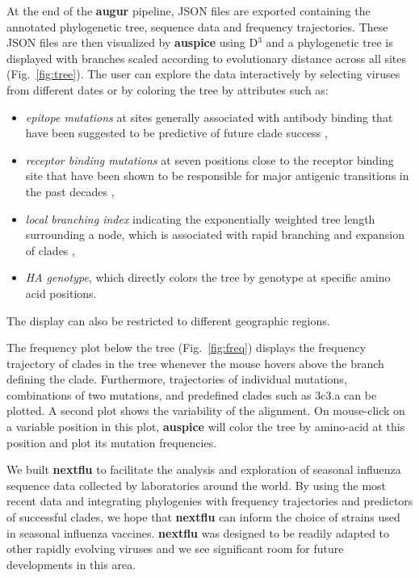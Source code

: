 \documentclass{bioinfo}
\newcommand{\FIG}[1]{Fig.~\ref{fig:#1}}
\newcommand{\augur}{\textbf{augur}}
\newcommand{\auspice}{\textbf{auspice}}
\newcommand{\nextflu}{\textbf{nextflu}}
\begin{document}
At the end of the \augur{} pipeline, JSON files are exported containing the annotated phylogenetic tree, sequence data and frequency trajectories.
These JSON files are then visualized by \auspice{} using D$^3$ \citep{bostock_d3_2011} and a phylogenetic tree is displayed with branches scaled according to evolutionary distance across all sites (\FIG{tree}).
The user can explore the data interactively by selecting viruses from different dates or by coloring the tree by attributes such as:
\begin{itemize}
	\item \textit{epitope mutations} at sites generally associated with antibody binding that have been suggested to be predictive of future clade success \citep{luksza_predictive_2014},
    \item \textit{receptor binding mutations} at seven positions close to the receptor binding site that have been shown to be responsible for major antigenic transitions in the past decades \citep{koel_substitutions_2013},
    \item \textit{local branching index} indicating the exponentially weighted tree length surrounding a node, which is associated with rapid branching and expansion of clades \citep{neher_predicting_2014},
    \item \textit{HA genotype}, which directly colors the tree by genotype at specific amino acid positions.
\end{itemize}
The display can also be restricted to different geographic regions.

The frequency plot below the tree (\FIG{freq}) displays the frequency trajectory of clades in the tree whenever the mouse hovers above the branch defining the clade. Furthermore, trajectories of individual mutations, combinations of two mutations, and predefined clades such as 3c3.a can be plotted. A second plot shows the variability of the alignment. On mouse-click on a variable position in this plot, \auspice{} will color the tree by amino-acid at this position and plot its mutation frequencies.

We built \nextflu{} to facilitate the analysis and exploration of seasonal influenza sequence data collected by laboratories around the world.
By using the most recent data and integrating phylogenies with frequency trajectories and predictors of successful clades, we hope that \nextflu{} can inform the choice of strains used in seasonal influenza vaccines. 
\nextflu{} was designed to be readily adapted to other rapidly evolving viruses and we see significant room for future developments in this area.
 
\end{document}
